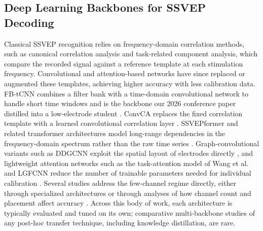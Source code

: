 \documentclass[11pt,a4paper,twoside,asymmetric]{article}
\begin{document}
\subsection{Deep Learning Backbones for SSVEP Decoding}
Classical SSVEP recognition relies on frequency-domain correlation methods, such as canonical correlation analysis and task-related component analysis, which compare the recorded signal against a reference template at each stimulation frequency. Convolutional and attention-based networks have since replaced or augmented these templates, achieving higher accuracy with less calibration data. FB-tCNN combines a filter bank with a time-domain convolutional network to handle short time windows \cite{R16} and is the backbone our 2026 conference paper distilled into a low-electrode student \cite{R82}. ConvCA replaces the fixed correlation template with a learned convolutional correlation layer \cite{R17}. SSVEPformer and related transformer architectures model long-range dependencies in the frequency-domain spectrum rather than the raw time series \cite{R15,R23}. Graph-convolutional variants such as DDGCNN exploit the spatial layout of electrodes directly \cite{R18}, and lightweight attention networks such as the task-attention model of Wang et al. and LGFCNN reduce the number of trainable parameters needed for individual calibration \cite{R20,R26}. Several studies address the few-channel regime directly, either through specialized architectures \cite{R22,R25,R38} or through analyses of how channel count and placement affect accuracy \cite{R36,R37}. Across this body of work, each architecture is typically evaluated and tuned on its own; comparative multi-backbone studies of any post-hoc transfer technique, including knowledge distillation, are rare.
\end{document}
